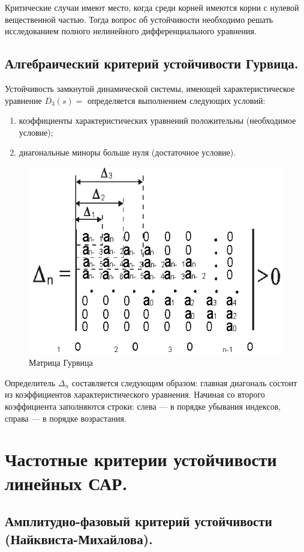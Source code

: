 \documentclass[unicode, 12pt, a4paper, oneside]{article}
\begin{document}
Критические случаи имеют место, когда среди корней имеются корни с нулевой вещественной частью. Тогда вопрос об устойчивости необходимо решать исследованием полного нелинейного дифференциального уравнения.

\subsection{Алгебраический критерий устойчивости Гурвица.}

Устойчивость замкнутой динамической системы, имеющей характеристическое уравнение $ D_3(s) =  $ определяется выполнением следующих условий:
\begin{enumerate}
\item коэффициенты характеристических уравнений положительны (необходимое условие);
\item диагональные миноры больше нуля (достаточное условие).
\end{enumerate}

\begin{figure}[H]
\centering
\includegraphics[width=0.5\linewidth]{26_matrix.png}
\caption{Матрица Гурвица}
\end{figure}

Определитель $ \Delta_n $ составляется следующим образом: главная диагональ состоит из коэффициентов характеристического уравнения. Начиная со второго коэффициента заполняются строки: слева --- в порядке убывания индексов, справа --- в порядке возрастания.

\section{Частотные критерии устойчивости линейных САР.}

\subsection*{Амплитудно-фазовый критерий устойчивости (Найквиста-Михайлова).}
\end{document}
